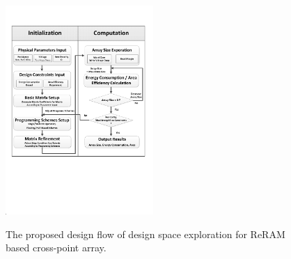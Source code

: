 \begin{figure}[!t]
\centering
  \includegraphics[width=0.5\textwidth]{./figures/FlowChart.pdf}\\
  \caption{The proposed design flow of design space exploration for ReRAM based cross-point array.}\label{fig:FlowChart}
  \vspace{-10pt}
\end{figure}
